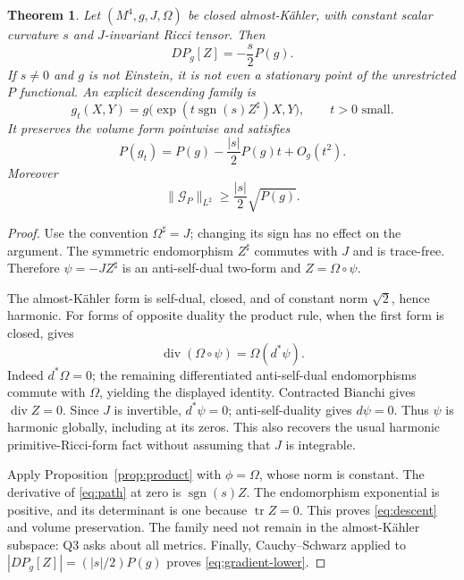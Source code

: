 \documentclass[11pt,a4paper]{article}
\newtheorem{theorem}{Theorem}[section]
\theoremstyle{remark}\newtheorem{remark}[theorem]{Remark}
\newcommand{\tr}{\operatorname{tr}}
\newcommand{\diver}{\operatorname{div}}
\numberwithin{equation}{section}
\begin{document}
\begin{theorem}\label{thm:AK}
Let $(M^4,g,J,\Omega)$ be closed almost-K\"ahler, with constant
scalar curvature $s$ and $J$-invariant Ricci tensor. Then
\begin{equation}\label{eq:AK-variation}
 \boxed{DP_g[Z]=-\frac{s}{2}P(g).}
\end{equation}
If $s\ne0$ and $g$ is not Einstein, it is not even a stationary point
of the unrestricted $P$ functional. An explicit descending family is
\begin{equation}\label{eq:path}
 g_t(X,Y)=g\bigl(\exp(t\operatorname{sgn}(s)Z^\sharp)X,Y\bigr),
 \qquad t>0\text{ small}.
\end{equation}
It preserves the volume form pointwise and satisfies
\begin{equation}\label{eq:descent}
 P(g_t)=P(g)-\frac{|s|}{2}P(g)t+O_g(t^2).
\end{equation}
Moreover
\begin{equation}\label{eq:gradient-lower}
 \|\mathcal G_P\|_{L^2}\ge\frac{|s|}{2}\sqrt{P(g)}.
\end{equation}
\end{theorem}
\begin{proof}
Use the convention $\Omega^\sharp=J$; changing its sign has no effect
on the argument. The symmetric endomorphism $Z^\sharp$ commutes with
$J$ and is trace-free. Therefore $\psi=-JZ^\sharp$ is an anti-self-dual
two-form and $Z=\Omega\circ\psi$.

The almost-K\"ahler form is self-dual, closed, and of constant norm
$\sqrt2$, hence harmonic. For forms of opposite duality the product
rule, when the first form is closed, gives
\[
 \diver(\Omega\circ\psi)=\Omega(d^*\psi).
\]
Indeed $d^*\Omega=0$; the remaining differentiated anti-self-dual
endomorphisms commute with $\Omega$, yielding the displayed identity.
Contracted Bianchi gives $\diver Z=0$. Since $J$ is invertible,
$d^*\psi=0$; anti-self-duality gives $d\psi=0$. Thus $\psi$ is
harmonic globally, including at its zeros. This also recovers the
usual harmonic primitive-Ricci-form fact without assuming that $J$
is integrable.

Apply Proposition~\ref{prop:product} with $\phi=\Omega$, whose norm
is constant. The derivative of \eqref{eq:path} at zero is
$\operatorname{sgn}(s)Z$. The endomorphism exponential is positive,
and its determinant is one because $\tr Z=0$. This proves
\eqref{eq:descent} and volume preservation. The family need not remain
in the almost-K\"ahler subspace: Q3 asks about all metrics.
Finally, Cauchy--Schwarz applied to
$|DP_g[Z]|=(|s|/2)P(g)$ proves \eqref{eq:gradient-lower}.
\end{proof}
\end{document}
